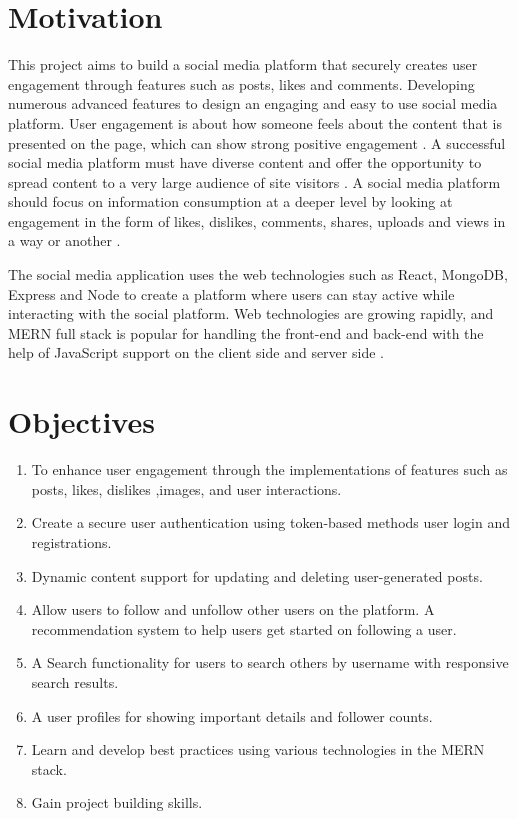 \section{Motivation}
This project aims to build a social media platform that securely creates user engagement through features such as posts, likes and comments. Developing numerous advanced features to design an engaging and easy to use social media platform. User engagement is about how someone feels about the content that is presented on the page, which can show strong positive engagement \cite{shahbaznezhad2021role}. A successful social media platform must have diverse content and offer the opportunity to spread content to a very large audience of site visitors \cite{khan2017social}. A social media platform should focus on information consumption at a deeper level by looking at engagement in the form of likes, dislikes, comments, shares, uploads and views in a way or another \cite{khan2017social}.

The social media application uses the web technologies such as React, MongoDB, Express and Node to create a platform where users can stay active while interacting with the social platform. Web technologies are growing rapidly, and MERN full stack is popular for handling the front-end and back-end with the help of JavaScript support on the client side and server side \cite{aryal2020mern}. 

\section{Objectives}
\begin{enumerate}
  \item To enhance user engagement through the implementations of features such as posts, likes, dislikes ,images, and user interactions.
  \item Create a secure user authentication using token-based methods user login and registrations.
  \item Dynamic content support for updating and deleting user-generated posts.  
  \item Allow users to follow and unfollow other users on the platform. A recommendation system to help users get started on following a user.
   \item A Search functionality for users to search others by username with responsive search results.
   \item A user profiles for showing important details and follower counts.
   \item Learn and develop best practices using various
   technologies in the MERN stack. 
   \item Gain project building skills.
\end{enumerate}

